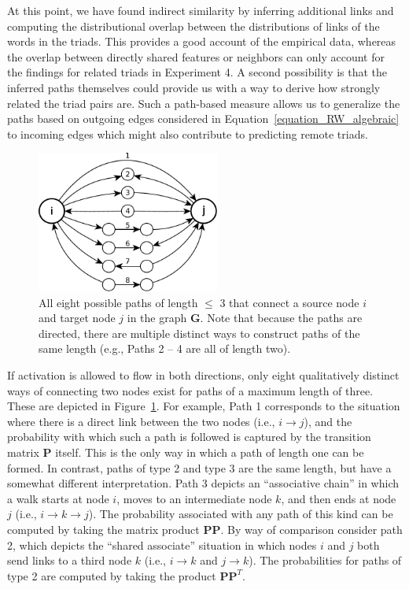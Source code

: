 \documentclass[doc]{apa6}
\begin{document}
At this point, we have found indirect similarity by inferring additional links and computing the distributional overlap between the distributions of links of the words in the triads. This provides a good account of the empirical data, whereas the overlap between directly shared features or neighbors can only account for the findings for related triads in Experiment 4.
A second possibility is that the inferred paths themselves could provide us with a way to derive how strongly related the triad pairs are. Such a path-based measure allows us to generalize the paths based on outgoing edges considered in Equation~\ref{equation_RW_algebraic} to incoming edges which might also contribute to predicting remote triads.


\begin{figure}[ht]
\centering
\includegraphics[width=6cm]{images/eightPaths2014.pdf}
\caption{\small{All eight possible paths of length $\leq$ 3 that connect a source node $i$ and target node $j$ in the graph $\mathbf{G}$. Note that because the paths are directed, there are multiple distinct ways to construct paths of the same length (e.g., Paths 2 -- 4 are all of length two).}}
\label{fig:pathIllustration}
\end{figure}

If activation is allowed to flow in both directions, only eight qualitatively distinct ways of connecting two nodes exist for paths of a maximum length of three. These are depicted in Figure~\ref{fig:pathIllustration}. For example, Path 1 corresponds to the situation where there is a direct link between the two nodes (i.e., $i \rightarrow j$), and the probability with which such a path is followed is captured by the transition matrix $\mathbf{P}$ itself. This is the only way in which a path of length one can be formed. In contrast, paths of type 2 and type 3 are the same length, but have a somewhat different interpretation. Path 3 depicts an ``associative chain'' in which a walk starts at node $i$, moves to an intermediate node $k$, and then ends at node $j$ (i.e., $i \rightarrow k \rightarrow j$). The probability associated with any path of this kind can be computed by taking the matrix product $\mathbf{P} \mathbf{P}$. By way of comparison consider path 2, which depicts the ``shared associate'' situation in which nodes $i$ and $j$ both send links to a third node $k$ (i.e., $i \rightarrow k$ and $j \rightarrow k$). The probabilities for paths of type 2 are computed by taking the product $\mathbf{P} \mathbf{P}^T$.
\end{document}
